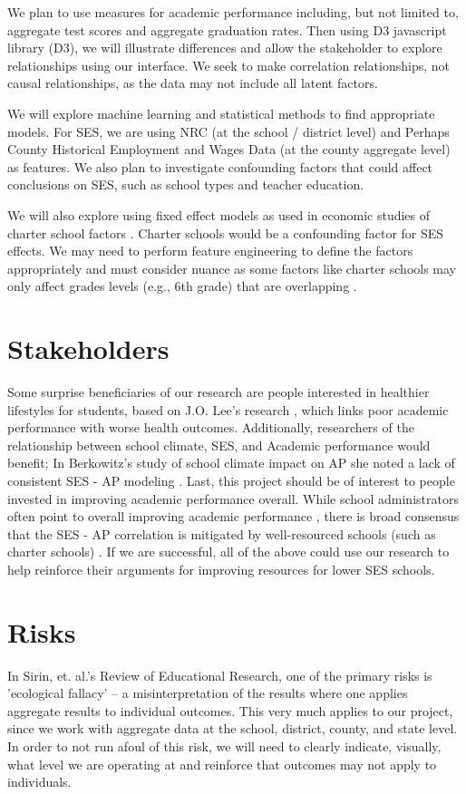 \documentclass[sigconf,nonacm,11pt]{acmart}
\begin{document}
We plan to use measures for academic performance including, but not limited to, aggregate test scores and aggregate graduation rates.  Then using D3 javascript library (D3), we will illustrate differences and allow the stakeholder to explore relationships using our interface. We seek to make correlation relationships, not causal relationships, as the data may not include all latent factors.

We will explore machine learning and statistical methods to find appropriate models.  For SES, we are using NRC (at the school / district level) and Perhaps County Historical Employment and Wages Data (at the county aggregate level) as features. We also plan to investigate confounding factors that could affect conclusions on SES, such as school types and teacher education.

We will also explore using fixed effect models as used in economic studies of charter school factors \cite{winters, jinnai}. Charter schools would be a confounding factor for SES effects. We may need to perform feature engineering to define the factors appropriately and must consider nuance as some factors like charter schools may only affect grades levels (e.g., 6th grade) that are overlapping \cite{jinnai}.

\section{Stakeholders}
Some surprise beneficiaries of our research are people interested in healthier lifestyles for students, based on J.O. Lee's research \cite{lee}, which links poor academic performance with worse health outcomes. Additionally, researchers of the relationship between school climate, SES, and Academic performance would benefit; In Berkowitz's study of school climate impact on AP she noted a lack of consistent SES - AP modeling \cite{berkowitz}. Last, this project should be of interest to people invested in improving academic performance overall. While school administrators often point to overall improving academic performance \cite{domanico}, there is broad consensus that the SES - AP correlation is mitigated by well-resourced schools (such as charter schools) \cite{domanico, jinnai}. If we are successful, all of the above could use our research to help reinforce their arguments for improving resources for lower SES schools.

\section{Risks}
In Sirin, et. al.'s Review of Educational Research, one of the primary risks is 'ecological fallacy' \cite{sirin} -- a misinterpretation of the results where one applies aggregate results to individual outcomes.  This very much applies to our project, since we work with aggregate data at the school, district, county, and state level.  In order to not run afoul of this risk, we will need to clearly indicate, visually, what level we are operating at and reinforce that outcomes may not apply to individuals.
\end{document}
